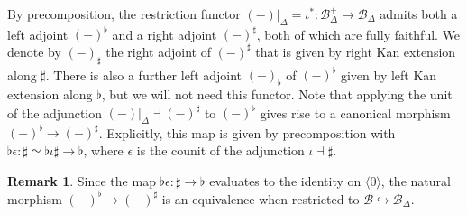 \documentclass[reqno]{amsart}
\numberwithin{equation}{subsection}
\theoremstyle{plain}
\theoremstyle{definition}
\newtheorem{remark}[equation]{Remark}
\let\scr=\mathcal
\let\into=\hookrightarrow
\def\BB{\scr B}
\newcommand{\ord}[1]{\langle#1\rangle}
\newcommand{\Simp}[1]{#1_{\Delta}}
\newcommand{\mSimp}[1]{#1_{\Delta}^+}
\begin{document}
By precomposition, the restriction functor $(-)\vert_{\Delta}=\iota^\ast\colon \mSimp{\BB}\to\Simp\BB$ admits both a left adjoint $(-)^\flat$ and a right adjoint $(-)^\sharp$, both of which are fully faithful. We denote by $(-)_\sharp$ the right adjoint of $(-)^\sharp$ that is given by right Kan extension along $\sharp$. There is also a further left adjoint $(-)_\flat$ of $(-)^\flat$ given by left Kan extension along $\flat$, but we will not need this functor.
Note that applying the unit of the adjunction $(-)\vert_{\Delta}\dashv (-)^\sharp$ to $(-)^\flat$ gives rise to a canonical morphism $(-)^\flat\to (-)^\sharp$. Explicitly, this map is given by precomposition with $\flat \epsilon\colon \sharp\simeq \flat \iota \sharp\to \flat$, where $\epsilon$ is the counit of the adjunction $\iota\dashv \sharp$.
\begin{remark}
	\label{rem:FlatSharpRestrictionGroupoids}
	Since the map $\flat\epsilon\colon\sharp\to\flat$ evaluates to the identity on $\ord{0}$, the natural morphism $(-)^\flat\to (-)^\sharp$ is an equivalence when restricted to $\BB\into\Simp\BB$.
\end{remark}
\end{document}

